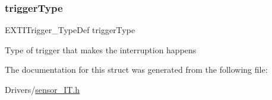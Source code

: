 \subsubsection{\texorpdfstring{trigger\+Type}{triggerType}}
{\footnotesize\ttfamily E\+X\+T\+I\+Trigger\+\_\+\+Type\+Def trigger\+Type}

Type of trigger that makes the interruption happens 

The documentation for this struct was generated from the following file\+:\begin{DoxyCompactItemize}
\item 
Drivers/\hyperlink{sensor___i_t_8h}{sensor\+\_\+\+I\+T.\+h}\end{DoxyCompactItemize}
